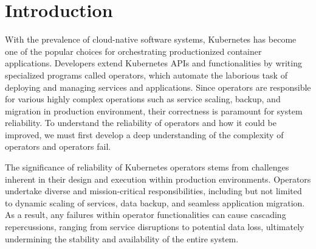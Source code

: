 \section{Introduction}
\label{sec:introduction}

With the prevalence of cloud-native software systems, Kubernetes \cite{k8s} has
become one of the popular choices for orchestrating productionized container
applications. Developers extend Kubernetes APIs and functionalities by writing
specialized programs called operators, which automate the laborious task of
deploying and managing services and applications. Since operators are
responsible for various highly complex operations such as service scaling,
backup, and migration in production environment, their correctness is paramount
for system reliability. To understand the reliability of operators and how it
could be improved, we must first develop a deep understanding of the complexity
of operators and operators fail.

The significance of reliability of Kubernetes operators stems from challenges
inherent in their design and execution within production environments.
Operators undertake diverse and mission-critical responsibilities, including
but not limited to dynamic scaling of services, data backup, and seamless
application migration. As a result, any failures within operator
functionalities can cause cascading repercussions, ranging from service
disruptions to potential data loss, ultimately undermining the stability and
availability of the entire system.
